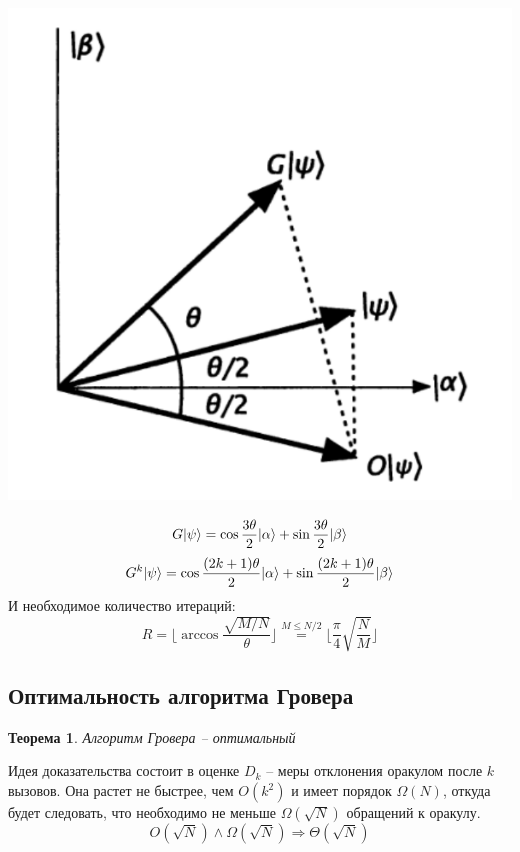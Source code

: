 \documentclass[a0,portrait]{a0poster}
\newtheorem{theor}{Теорема}[section]
\begin{document}
\begin{multicols}{2}
\begin{center}\vspace{1cm}
\includegraphics[scale=1]{grvr.pdf}
\end{center}\vspace{1cm}
\[
 G{\left\vert{\psi}\right\rangle} = \cos{\frac{3\theta}{2}}{\left\vert{\alpha}\right\rangle} + \sin{\frac{3\theta}{2}}{\left\vert{\beta}\right\rangle}
\]
\[
 G^k {\left\vert{\psi}\right\rangle} = \cos{\frac{(2k+1)\theta}{2}}{\left\vert{\alpha}\right\rangle} + \sin{\frac{(2k+1)\theta}{2}}{\left\vert{\beta}\right\rangle}
\]
И необходимое количество итераций:
\[
 R = \lfloor \arccos{\frac{\sqrt{M/N}}{\theta}} \rfloor \stackrel{M \leq N/2}{=} \lfloor \frac{\pi}{4} \sqrt{\frac{N}{M}} \rfloor
\]

\subsection{Оптимальность алгоритма Гровера}
\begin{theor}
 Алгоритм Гровера -- оптимальный
\end{theor}
Идея доказательства состоит в оценке $D_k$ -- меры отклонения оракулом после $k$ вызовов. Она растет не быстрее, чем $O(k^2)$ и имеет порядок $\Omega(N)$, откуда будет следовать, что необходимо не меньше  $\Omega(\sqrt{N})$ обращений к оракулу. 
\[
 O(\sqrt{N}) \wedge \Omega(\sqrt{N}) \Rightarrow \Theta(\sqrt{N})
\]


\end{multicols}
\end{document}
